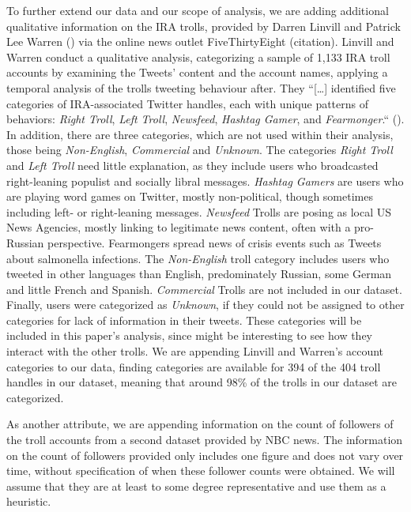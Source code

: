 \documentclass[12pt, titlepage=true, toc=bib]{scrartcl}
\begin{document}
To further extend our data and our scope of analysis, we are adding additional qualitative information on the IRA trolls, provided by Darren Linvill and Patrick Lee Warren (\cite*{linvill_troll_nodate}) via the online news outlet FiveThirtyEight (citation). Linvill and Warren conduct a qualitative analysis, categorizing a sample of 1,133 IRA troll accounts by examining the Tweets’ content and the account names, applying a temporal analysis of the trolls tweeting behaviour after. They “[…] identified five categories of IRA-associated Twitter handles, each with unique patterns of behaviors: \textit{Right Troll}, \textit{Left Troll}, \textit{Newsfeed}, \textit{Hashtag Gamer}, and \textit{Fearmonger}.“ (\cite[6]{linvill_troll_nodate}). In addition, there are three categories, which are not used within their analysis, those being \textit{Non-English}, \textit{Commercial} and \textit{Unknown}. The categories \textit{Right Troll} and \textit{Left Troll} need little explanation, as they include users who broadcasted right-leaning populist and socially libral messages. \textit{Hashtag Gamers} are users who are playing word games on Twitter, mostly non-political, though sometimes including left- or right-leaning messages. \textit{Newsfeed} Trolls are posing as local US News Agencies, mostly linking to legitimate news content, often with a pro-Russian perspective. Fearmongers spread news of crisis events such as Tweets about salmonella infections. The \textit{Non-English} troll category includes users who tweeted in other languages than English, predominately Russian, some German and little French and Spanish. \textit{Commercial} Trolls are not included in our dataset. Finally, users were categorized as \textit{Unknown}, if they could not be assigned to other categories for lack of information in their tweets. These categories will be included in this paper’s analysis, since might be interesting to see how they interact with the other trolls. We are appending Linvill and Warren’s account categories to our data, finding categories are available for 394 of the 404 troll handles in our dataset, meaning that around 98\% of the trolls in our dataset are categorized.
 
As another attribute, we are appending information on the count of followers of the troll accounts from a second dataset provided by NBC news. The information on the count of followers provided only includes one figure and does not vary over time, without specification of when these follower counts were obtained. We will assume that they are at least to some degree representative and use them as a heuristic. 
\end{document}
